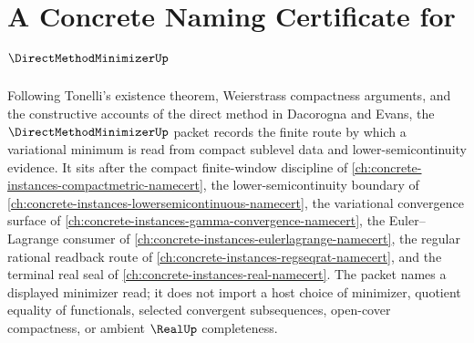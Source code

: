 \chapter{A Concrete Naming Certificate for $\DirectMethodMinimizerUp$}
\label{ch:concrete-instances-direct-method-minimizer-namecert}

Following Tonelli's existence theorem, Weierstrass compactness arguments, and the constructive accounts of the direct method in Dacorogna and Evans, the $\DirectMethodMinimizerUp$ packet records the finite route by which a variational minimum is read from compact sublevel data and lower-semicontinuity evidence. It sits after the compact finite-window discipline of \autoref{ch:concrete-instances-compactmetric-namecert}, the lower-semicontinuity boundary of \autoref{ch:concrete-instances-lowersemicontinuous-namecert}, the variational convergence surface of \autoref{ch:concrete-instances-gamma-convergence-namecert}, the Euler--Lagrange consumer of \autoref{ch:concrete-instances-eulerlagrange-namecert}, the regular rational readback route of \autoref{ch:concrete-instances-regseqrat-namecert}, and the terminal real seal of \autoref{ch:concrete-instances-real-namecert}. The packet names a displayed minimizer read; it does not import a host choice of minimizer, quotient equality of functionals, selected convergent subsequences, open-cover compactness, or ambient $\RealUp$ completeness.

